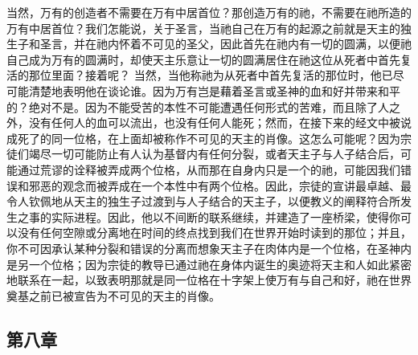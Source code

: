 当然，万有的创造者不需要在万有中居首位？那创造万有的祂，不需要在祂所造的万有中居首位？我们怎能说，关于圣言，当祂自己在万有的起源之前就是天主的独生子和圣言，并在祂内怀着不可见的圣父，因此首先在祂内有一切的圆满，以便祂自己成为万有的圆满时，却使天主乐意让一切的圆满居住在祂这位从死者中首先复活的那位里面？接着呢？ 当然，当他称祂为从死者中首先复活的那位时，他已尽可能清楚地表明他在谈论谁。因为万有岂是藉着圣言或圣神的血和好并带来和平的？绝对不是。因为不能受苦的本性不可能遭遇任何形式的苦难，而且除了人之外，没有任何人的血可以流出，也没有任何人能死；然而，在接下来的经文中被说成死了的同一位格，在上面却被称作不可见的天主的肖像。这怎么可能呢？因为宗徒们竭尽一切可能防止有人认为基督内有任何分裂，或者天主子与人子结合后，可能通过荒谬的诠释被弄成两个位格，从而那在自身内只是一个的祂，可能因我们错误和邪恶的观念而被弄成在一个本性中有两个位格。因此，宗徒的宣讲最卓越、最令人钦佩地从天主的独生子过渡到与人子结合的天主子，以便教义的阐释符合所发生之事的实际进程。因此，他以不间断的联系继续，并建造了一座桥梁，使得你可以没有任何空隙或分离地在时间的终点找到我们在世界开始时读到的那位；并且，你不可因承认某种分裂和错误的分离而想象天主子在肉体内是一个位格，在圣神内是另一个位格；因为宗徒的教导已通过祂在身体内诞生的奥迹将天主和人如此紧密地联系在一起，以致表明那就是同一位格在十字架上使万有与自己和好，祂在世界奠基之前已被宣告为不可见的天主的肖像。\par


\subsection{第八章}

\par

